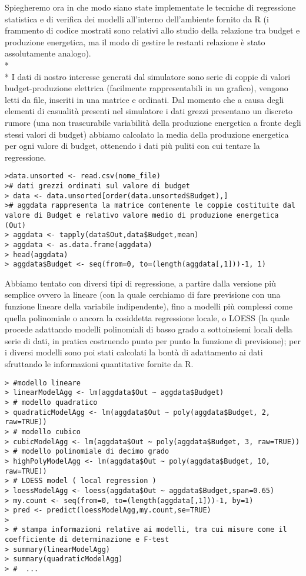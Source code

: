 \documentclass[12pt,a4paper,openright,twoside]{report}
\begin{document}
Spiegheremo ora in che modo siano state implementate le tecniche di regressione statistica e di verifica dei modelli all'interno dell'ambiente fornito da R (i frammento di codice mostrati sono relativi allo studio della relazione tra budget e produzione energetica, ma il modo di gestire le restanti relazione è stato assolutamente analogo).\\*\\*
I dati di nostro interesse generati dal simulatore sono serie di coppie di valori budget-produzione elettrica (facilmente rappresentabili in un grafico), vengono letti da file, inseriti in una matrice e ordinati. Dal momento che a causa degli elementi di casualità presenti nel simulatore i dati grezzi presentano un discreto rumore (una non trascurabile variabilità della produzione energetica a fronte degli stessi valori di budget) abbiamo calcolato la media della produzione energetica per ogni valore di budget, ottenendo i dati più puliti con cui tentare la regressione.

\begin{lstlisting}
>data.unsorted <- read.csv(nome_file)
># dati grezzi ordinati sul valore di budget
> data <- data.unsorted[order(data.unsorted$Budget),]
># aggdata rappresenta la matrice contenente le coppie costituite dal valore di Budget e relativo valore medio di produzione energetica (Out)
> aggdata <- tapply(data$Out,data$Budget,mean)
> aggdata <- as.data.frame(aggdata)  
> head(aggdata)
> aggdata$Budget <- seq(from=0, to=(length(aggdata[,1]))-1, 1)
\end{lstlisting}
 
Abbiamo tentato con diversi tipi di regressione, a partire dalla versione più semplice ovvero la lineare \cite{robustLinearRegression}(con la quale cerchiamo di fare previsione con una funzione lineare della variabile indipendente), fino a modelli più complessi come quella polinomiale \cite{Gergonne1974439,Stigler1974431} o ancora la cosiddetta regressione locale, o LOESS \cite{lowess}(la quale procede adattando modelli polinomiali di basso grado a sottoinsiemi locali della serie di dati, in pratica costruendo punto per punto la funzione di previsione); per i diversi modelli sono poi stati calcolati la bontà di adattamento ai dati sfruttando le informazioni quantitative fornite da R.

\begin{lstlisting}
> #modello lineare
> linearModelAgg <- lm(aggdata$Out ~ aggdata$Budget)
> # modello quadratico
> quadraticModelAgg <- lm(aggdata$Out ~ poly(aggdata$Budget, 2, raw=TRUE))
> # modello cubico
> cubicModelAgg <- lm(aggdata$Out ~ poly(aggdata$Budget, 3, raw=TRUE))
> # modello polinomiale di decimo grado
> highPolyModelAgg <- lm(aggdata$Out ~ poly(aggdata$Budget, 10, raw=TRUE))
> # LOESS model ( local regression )
> loessModelAgg <- loess(aggdata$Out ~ aggdata$Budget,span=0.65)
> my.count <- seq(from=0, to=(length(aggdata[,1]))-1, by=1)
> pred <- predict(loessModelAgg,my.count,se=TRUE)
>
> # stampa informazioni relative ai modelli, tra cui misure come il coefficiente di determinazione e F-test
> summary(linearModelAgg)
> summary(quadraticModelAgg)
> #  ... 
\end{lstlisting}
\end{document}
